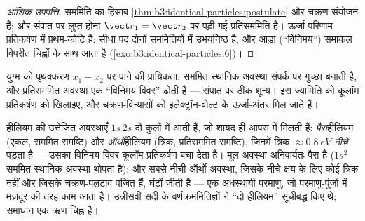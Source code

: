 \begin{proof}[आंशिक उपपत्ति]
सममिति का हिसाब \cref{thm:b3:identical-particles:postulate} और
चक्रण-संयोजन हैं; और संपात पर लुप्त होना $\vect r_1 = \vect r_2$ पर
पढ़ी गई प्रतिसममिति है। ऊर्जा-परिणाम प्रतिकर्षण में प्रथम-कोटि
 है: सीधा पद दोनों सममितियों में उभयनिष्ठ है, और
आड़ा (``विनिमय'') समाकल विपरीत चिह्नों के साथ आता है
(\cref{exo:b3:identical-particles:6})।
\end{proof}

\begin{omfigure}

{\small युग्म को पृथक्करण $x_1 - x_2$ पर पाने की प्रायिकता:
सममित स्थानिक अवस्था संपर्क पर गुच्छा बनाती है, और प्रतिसममित अवस्था
एक ``विनिमय विवर'' ढोती है --- संपात पर ठीक शून्य। इस ज्यामिति को
कूलॉम प्रतिकर्षण को खिलाइए, और चक्रण-विन्यासों को इलेक्ट्रॉन-वोल्ट के
ऊर्जा-अंतर मिल जाते हैं।}
\end{omfigure}

\begin{example}[एक ही परमाणु में दो हीलियम]\label{ex:b3:identical-particles:helium}
हीलियम की उत्तेजित अवस्थाएँ $1s\,2s$ दो कुलों में आती हैं, जो शायद ही
आपस में मिलती हैं: \emph{पैरा}हीलियम (एकल, सममित समष्टि) और
\emph{ऑर्थो}हीलियम (त्रिक, प्रतिसममित समष्टि), जिनमें त्रिक
$\approx\qty{0.8}{eV}$ \emph{नीचे} पड़ता है --- उसका विनिमय विवर
कूलॉम प्रतिकर्षण बचा देता है। मूल अवस्था अनिवार्यतः पैरा है ($1s^2$
सममित स्थानिक अवस्था थोपता है); और सबसे नीची ऑर्थो अवस्था, जिसके नीचे
क्षय के लिए कोई त्रिक नहीं और जिसके चक्रण-पलटाव वर्जित हैं, घंटों
जीती है --- एक अर्धस्थायी परमाणु, जो परमाणु-पुंजों में मज़दूर की तरह
काम आता है। उन्नीसवीं सदी के वर्णक्रममितिज्ञों ने ``दो हीलियम''
सूचीबद्ध किए थे; समाधान एक ऋण चिह्न है।
\end{example}

